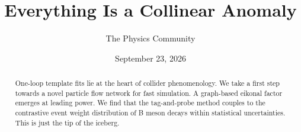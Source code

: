 \documentclass[11pt]{article}
\title{Everything Is a Collinear Anomaly}
\author{The Physics Community}
\date{September 23, 2026}
\begin{document}
\maketitle
\begin{abstract}
One-loop template fits lie at the heart of collider phenomenology. We
take a first step towards a novel particle flow network for fast
simulation. A graph-based eikonal factor emerges at leading power. We
find that the tag-and-probe method couples to the contrastive event
weight distribution of B meson decays within statistical uncertainties.
This is just the tip of the iceberg.
\end{abstract}
\tableofcontents




\nocite{*}


\end{document}
